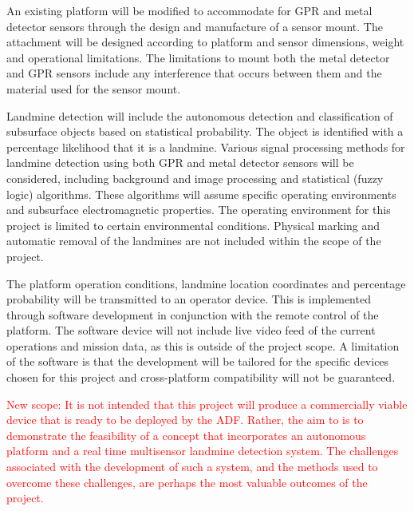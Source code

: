 \documentclass[main.tex]{subfiles}
\begin{document}
An existing platform will be modified to accommodate for GPR and metal detector sensors through the design and manufacture of a sensor mount. The attachment will be designed according to platform and sensor dimensions, weight and operational limitations. The limitations to mount both the metal detector and GPR sensors include any interference that occurs between them and the material used for the sensor mount.

Landmine detection will include the autonomous detection and classification of subsurface objects based on statistical probability. The object is identified with a percentage likelihood that it is a landmine. Various signal processing methods for landmine detection using both GPR and metal detector sensors will be considered, including background and image processing and statistical (fuzzy logic) algorithms. These algorithms will assume specific operating environments and subsurface electromagnetic properties. The operating environment for this project is limited to certain environmental conditions. Physical marking and automatic removal of the landmines are not included within the scope of the project.

The platform operation conditions, landmine location coordinates and percentage probability will be transmitted to an operator device. This is implemented through software development in conjunction with the remote control of the platform. The software device will not include live video feed of the current operations and mission data, as this is outside of the project scope. A limitation of the software is that the development will be tailored for the specific devices chosen for this project and cross-platform compatibility will not be guaranteed.

\textcolor{red}{New scope: It is not intended that this project will produce a commercially viable device that is ready to be deployed by the ADF. Rather, the aim to is to demonstrate the feasibility of a concept that incorporates an autonomous platform and a real time multisensor landmine detection system. The challenges associated with the development of such a system, and the methods used to overcome these challenges, are perhaps the most valuable outcomes of the project.}
 
\end{document}
